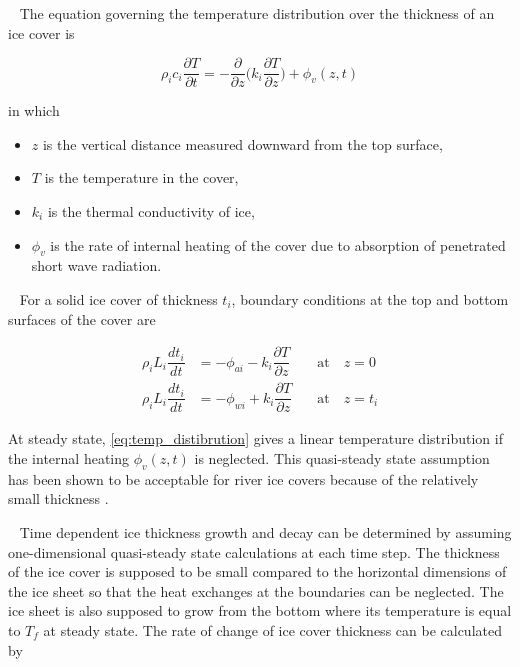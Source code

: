 ~\newline
The equation governing the temperature distribution over the thickness of an ice cover is

\begin{equation} \label{eq:temp_distibrution}
\rho_i c_i \dfrac{\partial T}{\partial t} = -\dfrac{\partial}{\partial z} \Big(k_i \dfrac{\partial T}{\partial z}\Big) + \phi_v(z,t)
\end{equation}

in which
\begin{itemize}
    \item $z$ is the vertical distance measured downward from the top surface,
    \item $T$ is the temperature in the cover,
    \item $k_i$ is the thermal conductivity of ice,
    \item $\phi_v$ is the rate of internal heating of the cover due to absorption of penetrated short wave radiation.
\end{itemize}

~\newline
For a solid ice cover of thickness $t_i$, boundary conditions at the top and bottom surfaces of the cover are

\begin{equation} \label{eq:bdy_top}
\begin{aligned}
\rho_i L_i \dfrac{dt_i}{dt} &= -\phi_{ai} - k_i \dfrac{\partial T}{\partial z} \quad & \text{at} \quad z=0 \\
\rho_i L_i \dfrac{dt_i}{dt} &= -\phi_{wi} + k_i \dfrac{\partial T}{\partial z} \quad & \text{at} \quad z=t_i
\end{aligned}
\end{equation}

At steady state, \eqref{eq:temp_distibrution} gives a linear temperature distribution if the internal heating $\phi_v(z,t)$ is neglected. This quasi-steady state assumption has been shown to be acceptable for river ice covers because of the relatively small thickness \cite{Greene1981}.

~\newline
Time dependent ice thickness growth and decay can be determined by assuming one-dimensional quasi-steady state calculations at each time step. The thickness of the ice cover is supposed to be small compared to the horizontal dimensions of the ice sheet so that the heat exchanges at the boundaries can be neglected. The ice sheet is also supposed to grow from the bottom where its temperature is equal to $T_f$ at steady state. The rate of change of ice cover thickness can be calculated by

